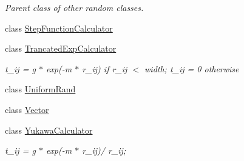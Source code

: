 \begin{DoxyCompactItemize}
\begin{DoxyCompactList}\small\item\em Parent class of other random classes. \end{DoxyCompactList}\item 
class \hyperlink{class_p_c_a_1_1_step_function_calculator}{Step\+Function\+Calculator}
\item 
class \hyperlink{class_p_c_a_1_1_trancated_exp_calculator}{Trancated\+Exp\+Calculator}
\begin{DoxyCompactList}\small\item\em t\+\_\+ij = g $\ast$ exp(-\/m $\ast$ r\+\_\+ij) if r\+\_\+ij $<$ width; t\+\_\+ij = 0 otherwise \end{DoxyCompactList}\item 
class \hyperlink{class_p_c_a_1_1_uniform_rand}{Uniform\+Rand}
\item 
class \hyperlink{class_p_c_a_1_1_vector}{Vector}
\item 
class \hyperlink{class_p_c_a_1_1_yukawa_calculator}{Yukawa\+Calculator}
\begin{DoxyCompactList}\small\item\em t\+\_\+ij = g $\ast$ exp(-\/m $\ast$ r\+\_\+ij)/ r\+\_\+ij; \end{DoxyCompactList}\end{DoxyCompactItemize}
